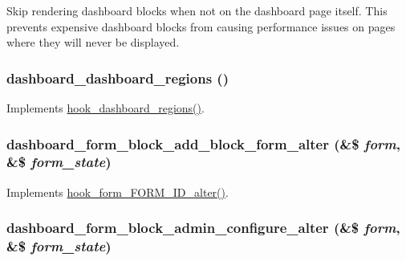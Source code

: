 Skip rendering dashboard blocks when not on the dashboard page itself. This prevents expensive dashboard blocks from causing performance issues on pages where they will never be displayed. \hypertarget{dashboard_8module_ad0e0798be026863f02c9b4e316fc1286}{
\subsubsection[{dashboard\_\-dashboard\_\-regions}]{\setlength{\rightskip}{0pt plus 5cm}dashboard\_\-dashboard\_\-regions ()}}
\label{dashboard_8module_ad0e0798be026863f02c9b4e316fc1286}
Implements \hyperlink{group__hooks_ga533120daedea0c0bfd332400aab41ae2}{hook\_\-dashboard\_\-regions()}. \hypertarget{dashboard_8module_a36ed992fdf3f66ca72b06a219ff42100}{
\subsubsection[{dashboard\_\-form\_\-block\_\-add\_\-block\_\-form\_\-alter}]{\setlength{\rightskip}{0pt plus 5cm}dashboard\_\-form\_\-block\_\-add\_\-block\_\-form\_\-alter (\&\$ {\em form}, \/  \&\$ {\em form\_\-state})}}
\label{dashboard_8module_a36ed992fdf3f66ca72b06a219ff42100}
Implements \hyperlink{group__hooks_ga8d4a4089551493d55911bd5c4f218264}{hook\_\-form\_\-FORM\_\-ID\_\-alter()}. \hypertarget{dashboard_8module_abc9f64b9c3b100c4e0e4450cc8c50bf0}{
\subsubsection[{dashboard\_\-form\_\-block\_\-admin\_\-configure\_\-alter}]{\setlength{\rightskip}{0pt plus 5cm}dashboard\_\-form\_\-block\_\-admin\_\-configure\_\-alter (\&\$ {\em form}, \/  \&\$ {\em form\_\-state})}}
